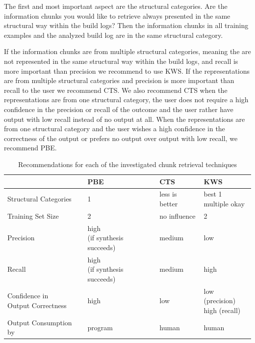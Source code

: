 \documentclass[\myrootdir/main.tex]{subfiles}
\begin{document}
The first and most important aspect are the structural categories.
Are the information chunks you would like to retrieve always presented in the same structural way within the build logs?
Then the information chunks in all training examples and the analyzed build log are in the same structural category.

If the information chunks are from multiple structural categories, meaning the are not represented in the same structural way within the build logs, and recall is more important than precision we recommend to use KWS\@.
If the representations are from multiple structural categories and precision is more important than recall to the user we recommend CTS\@.
We also recommend CTS when the representations are from one structural category, the user does not require a high confidence in the precision or recall of the outcome and the user rather have output with low recall instead of no output at all.
When the representations are from one structural category and the user wishes a high confidence in the correctness of the output or prefers no output over output with low recall, we recommend PBE\@.

\begin{table}[htbp]
\centering
\begin{tabularx}{\textwidth}{@{}llll@{}}
  \toprule
  & PBE & CTS & KWS \\
  \midrule
  Structural Categories & 1 & less is better & \makecell[l]{best 1 \\ multiple okay} \\
  Training Set Size & 2 & no influence & 2 \\ 
  Precision & \makecell[l]{high \\ (if synthesis succeeds)} & medium & low \\ 
  Recall & \makecell[l]{high \\ (if synthesis succeeds)} & medium & high \\ 
  \makecell[l]{Confidence in \\ Output Correctness} & high & low & \makecell[l]{low (precision) \\ high (recall)} \\ 
  Output Consumption by & program & human & human \\ 
  \bottomrule
\end{tabularx}
\caption{Recommendations for each of the investigated chunk retrieval techniques}
\label{tab:single-technique-recommendations}
\end{table}
\end{document}

